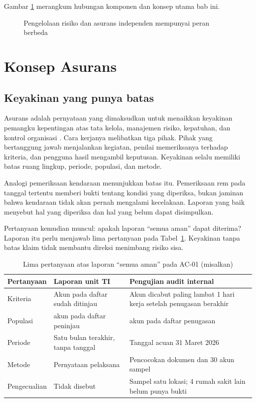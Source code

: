 Gambar \ref{fig:ch12-ilustrasi-bab} merangkum hubungan komponen dan konsep utama bab ini.
\begin{figure}[!htb]
  \centering
  
  \caption{Pengelolaan risiko dan asurans independen mempunyai peran berbeda}
  \label{fig:ch12-ilustrasi-bab}
\end{figure}

\section{Konsep Asurans}

\subsection*{Keyakinan yang punya batas}

Asurans adalah pernyataan yang dimaksudkan untuk menaikkan keyakinan pemangku kepentingan atas
tata kelola, manajemen risiko, kepatuhan, dan kontrol organisasi \cite{iia-tlm2026}. Cara
kerjanya melibatkan tiga pihak. Pihak yang bertanggung jawab menjalankan kegiatan, penilai
memeriksanya terhadap kriteria, dan pengguna hasil mengambil keputusan. Keyakinan selalu
memiliki batas ruang lingkup, periode, populasi, dan metode.

Analogi pemeriksaan kendaraan menunjukkan batas itu. Pemeriksaan rem pada tanggal tertentu
memberi bukti tentang kondisi yang diperiksa, bukan jaminan bahwa kendaraan tidak akan pernah
mengalami kecelakaan. Laporan yang baik menyebut hal yang diperiksa dan hal yang belum dapat
disimpulkan.

Pertanyaan kemudian muncul: apakah laporan ``semua aman'' dapat diterima? Laporan itu perlu
menjawab lima pertanyaan pada Tabel~\ref{tab:ch12-lima-pertanyaan}. Keyakinan tanpa batas klaim
tidak membantu direksi menimbang risiko sisa.

\begin{table}[!htb]
  \centering\small
  \caption{Lima pertanyaan atas laporan ``semua aman'' pada AC-01 (misalkan)}
  \label{tab:ch12-lima-pertanyaan}
  \begin{tabularx}{\textwidth}{|>{\raggedright\arraybackslash}p{}|>{\raggedright\arraybackslash}X|>{\raggedright\arraybackslash}X|}
    \hline
    \textbf{Pertanyaan} & \textbf{Laporan unit TI} & \textbf{Pengujian audit internal} \\
    \hline
    Kriteria & Akun pada daftar sudah ditinjau & Akun dicabut paling lambat 1 hari kerja
    setelah penugasan berakhir \\ \hline
    Populasi & 108 akun pada daftar peninjau & 120 akun pada daftar penugasan \\ \hline
    Periode & Satu bulan terakhir, tanpa tanggal & Tanggal acuan 31 Maret 2026 \\ \hline
    Metode & Pernyataan pelaksana & Pencocokan dokumen dan 30 akun sampel \\ \hline
    Pengecualian & Tidak disebut & Sampel satu lokasi; 4 rumah sakit lain belum punya bukti \\
    \hline
  \end{tabularx}
\end{table}

